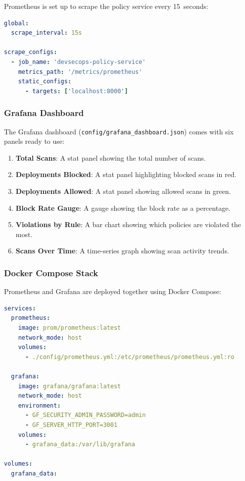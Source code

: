 Prometheus is set up to scrape the policy service every 15~seconds:

\begin{lstlisting}[language=yaml, caption={Prometheus scrape configuration (\texttt{prometheus.yml}).}, label={lst:prom-config}]
global:
  scrape_interval: 15s

scrape_configs:
  - job_name: 'devsecops-policy-service'
    metrics_path: '/metrics/prometheus'
    static_configs:
      - targets: ['localhost:8000']
\end{lstlisting}

\subsubsection{Grafana Dashboard}

The Grafana dashboard (\texttt{config/grafana\_dashboard.json}) comes with six panels ready to use:

\begin{enumerate}[leftmargin=1.5cm]
  \item \textbf{Total Scans}: A stat panel showing the total number of scans.
  \item \textbf{Deployments Blocked}: A stat panel highlighting blocked scans in red.
  \item \textbf{Deployments Allowed}: A stat panel showing allowed scans in green.
  \item \textbf{Block Rate Gauge}: A gauge showing the block rate as a percentage.
  \item \textbf{Violations by Rule}: A bar chart showing which policies are violated the most.
  \item \textbf{Scans Over Time}: A time-series graph showing scan activity trends.
\end{enumerate}

\subsubsection{Docker Compose Stack}

Prometheus and Grafana are deployed together using Docker Compose:

\begin{lstlisting}[language=yaml, caption={Docker Compose for monitoring stack.}, label={lst:compose}]
services:
  prometheus:
    image: prom/prometheus:latest
    network_mode: host
    volumes:
      - ./config/prometheus.yml:/etc/prometheus/prometheus.yml:ro

  grafana:
    image: grafana/grafana:latest
    network_mode: host
    environment:
      - GF_SECURITY_ADMIN_PASSWORD=admin
      - GF_SERVER_HTTP_PORT=3001
    volumes:
      - grafana_data:/var/lib/grafana

volumes:
  grafana_data:
\end{lstlisting}

